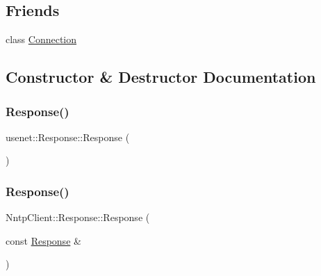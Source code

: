 \subsection*{Friends}
\begin{DoxyCompactItemize}
\item 
class \hyperlink{class_nntp_client_1_1_response_a54a11fdc71e1679a42fa0c0e3856673d}{Connection}
\end{DoxyCompactItemize}


\subsection{Constructor \& Destructor Documentation}
\hypertarget{class_nntp_client_1_1_response_a9fbd470d7d756f55327bf4ab858989b8}{}\label{class_nntp_client_1_1_response_a9fbd470d7d756f55327bf4ab858989b8} 
\subsubsection{\texorpdfstring{Response()}{Response()}\hspace{0.1cm}{\footnotesize\ttfamily [1/2]}}
{\footnotesize\ttfamily usenet\+::\+Response\+::\+Response (\begin{DoxyParamCaption}{ }\end{DoxyParamCaption})}

\hypertarget{class_nntp_client_1_1_response_a0e01a5eac8b5900fe834d2a2254a77e8}{}\label{class_nntp_client_1_1_response_a0e01a5eac8b5900fe834d2a2254a77e8} 
\subsubsection{\texorpdfstring{Response()}{Response()}\hspace{0.1cm}{\footnotesize\ttfamily [2/2]}}
{\footnotesize\ttfamily Nntp\+Client\+::\+Response\+::\+Response (\begin{DoxyParamCaption}\item[{const \hyperlink{class_nntp_client_1_1_response}{Response} \&}]{ }\end{DoxyParamCaption})\hspace{0.3cm}{\ttfamily [default]}}


